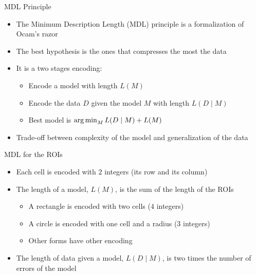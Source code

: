 \documentclass[10pt]{beamer}
\begin{document}
\begin{frame}{MDL Principle}
    \begin{itemize}
        \item The Minimum Description Length (MDL) principle is a formalization of Ocam's razor
        \item The best hypothesis is the ones that compresses the most the data
        \item It is a two stages encoding:
            \begin{itemize}
                \item Encode a model with length $L(M)$
                \item Encode the data $D$ given the model $M$ with length $L(D \mid M)$
                \item Best model is $\operatorname*{arg\,min}_{M} L(D \mid M) + L(M)$
            \end{itemize}
        \item Trade-off between complexity of the model and generalization of the data
    \end{itemize}
\end{frame}

\begin{frame}{MDL for the ROIs}
    \begin{itemize}
        \item Each cell is encoded with $2$ integers (its row and its column)
        \item The length of a model, $L(M)$, is the sum of the length of the ROIs
            \begin{itemize}
                \item A rectangle is encoded with two cells ($4$ integers)
                \item A circle is encoded with one cell and a radius ($3$ integers)
                \item Other forms have other encoding
            \end{itemize}
        \item The length of data given a model, $L(D \mid M)$, is two times the number of errors
            of the model
    \end{itemize}
\end{frame}
\end{document}
